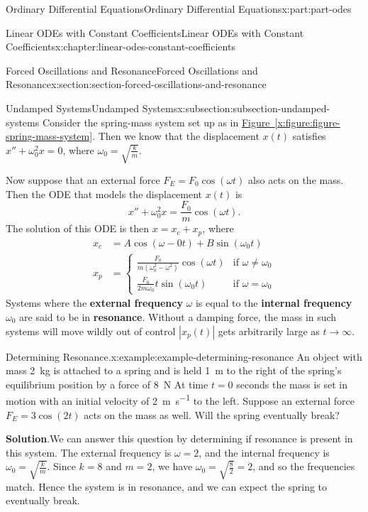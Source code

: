 \documentclass[twoside,10pt,]{book}
\newcommand{\blocktitlefont}{\relax}
\newcommand{\xreffont}{\relax}
\newcommand{\terminology}[1]{\textbf{#1}}
\numberwithin{equation}{part}
\newcommand{\amp}{&}
\begin{document}
\begin{partptx}{Ordinary Differential Equations}{}{Ordinary Differential Equations}{}{}{x:part:part-odes}
\begin{chapterptx}{Linear ODEs with Constant Coefficients}{}{Linear ODEs with Constant Coefficients}{}{}{x:chapter:linear-odes-constant-coefficients}
\begin{sectionptx}{Forced Oscillations and Resonance}{}{Forced Oscillations and Resonance}{}{}{x:section:section-forced-oscillations-and-resonance}
\begin{subsectionptx}{Undamped Systems}{}{Undamped Systems}{}{}{x:subsection:subsection-undamped-systems}
Consider the spring-mass system set up as in \hyperref[x:figure:figure-spring-mass-system]{Figure~{\xreffont\ref{x:figure:figure-spring-mass-system}}}. Then we know that the displacement \(x(t)\) satisfies \(x'' + \omega_{0}^{2}x = 0\), where \(\omega_{0} = \sqrt{\frac{k}{m}}\).%
\par
Now suppose that an external force \(F_{E} = F_{0}\cos(\omega t)\) also acts on the mass. Then the ODE that models the displacement \(x(t)\) is%
\begin{equation*}
x'' + \omega_{0}^{2}x = \frac{F_{0}}{m}\cos(\omega t).
\end{equation*}
The solution of this ODE is then \(x = x_{c} + x_{p}\), where%
\begin{align*}
x_{c} \amp= A\cos(\omega-{0}t) + B\sin(\omega_{0}t)\\
x_{p} \amp= \begin{cases} \frac{F_{0}}{m(\omega_{0}^{2} - \omega^{2})} \cos(\omega t) \amp\text{if }\omega\neq\omega_{0} \\ \frac{F_{0}}{2m\omega_{0}} t\sin(\omega_{0} t) \amp\text{if }\omega=\omega_{0} \end{cases}
\end{align*}
Systems where the \terminology{external frequency} \(\omega\) is equal to the \terminology{internal frequency} \(\omega_{0}\) are said to be in \terminology{resonance}. Without a damping force, the mass in such systems will move wildly out of control \(|x_{p}(t)|\) gets arbitrarily large as \(t\to\infty\).%
\begin{example}{Determining Resonance.}{x:example:example-determining-resonance}%
An object with mass \SI{2}{\kilo\gram} is attached to a spring and is held \SI{1}{\meter} to the right of the spring's equilibrium position by a force of \SI{8}{\newton} At time \(t = 0\) seconds the mass is set in motion with an initial velocity of \SI{2}{\meter\per\second} to the left. Suppose an external force \(F_{E} = 3\cos(2t)\) acts on the mass as well. Will the spring eventually break?%
\par\smallskip%
\noindent\textbf{\blocktitlefont Solution}.\hypertarget{g:solution:idp105548815786784}{}\quad{}We can answer this question by determining if resonance is present in this system. The external frequency is \(\omega = 2\), and the internal frequency is \(\omega_{0} = \sqrt{\frac{k}{m}}\). Since \(k = 8\) and \(m = 2\), we have \(\omega_{0} = \sqrt{\frac{8}{2}} = 2\), and so the frequencies match. Hence the system is in resonance, and we can expect the spring to eventually break.%

\end{example}
\end{subsectionptx}
\end{sectionptx}
\end{chapterptx}
\end{partptx}
\end{document}
